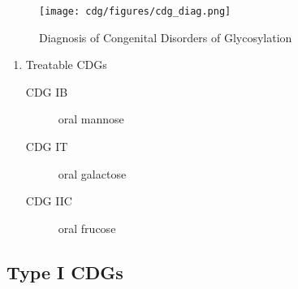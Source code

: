 \documentclass[12pt]{scrartcl}
\begin{document}
\begin{figure}[htbp]
\centering
\texttt{[image: cdg/figures/cdg\_diag.png]}
\caption{\label{fig:org1e28b5a}Diagnosis of Congenital Disorders of Glycosylation}
\end{figure}

\begin{enumerate}
\item Treatable CDGs
\label{sec:orgaea4396}
\begin{description}
\item[{CDG IB}] oral mannose
\item[{CDG IT}] oral galactose
\item[{CDG IIC}] oral frucose
\end{description}
\end{enumerate}

\subsection{Type I CDGs}
\label{sec:org1f6e014}
\end{document}
